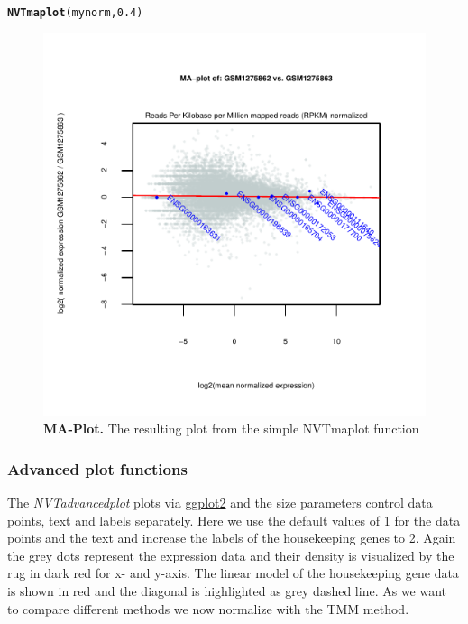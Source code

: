 \documentclass[11pt]{article}\usepackage[]{graphicx}\usepackage[usenames,dvipsnames]{color}
\makeatletter
\newcommand{\hlnum}[1]{\textcolor[rgb]{0.686,0.059,0.569}{#1}}%
\newcommand{\hlstd}[1]{\textcolor[rgb]{0.345,0.345,0.345}{#1}}%
\newcommand{\hlkwd}[1]{\textcolor[rgb]{0.737,0.353,0.396}{\textbf{#1}}}%
\newenvironment{kframe}{%
 \def\at@end@of@kframe{}%
 \ifinner\ifhmode%
  \def\at@end@of@kframe{\end{minipage}}%
  \begin{minipage}{\columnwidth}%
 \fi\fi%
 \def\FrameCommand##1{\hskip\@totalleftmargin \hskip-\fboxsep
 \colorbox{shadecolor}{##1}\hskip-\fboxsep
     \hskip-\linewidth \hskip-\@totalleftmargin \hskip\columnwidth}%
 \MakeFramed {\advance\hsize-\width
   \@totalleftmargin\z@ \linewidth\hsize
   \@setminipage}}%
 {\par\unskip\endMakeFramed%
 \at@end@of@kframe}
\newenvironment{knitrout}{}{} %
\makeatother
\begin{document}
\begin{knitrout}
\color{fgcolor}\begin{kframe}
\begin{alltt}
\hlkwd{NVTmaplot}\hlstd{(mynorm,}\hlnum{0.4}\hlstd{)}
\end{alltt}
\end{kframe}
\end{knitrout}

\begin{figure}[!h]
\centering
\includegraphics[width=.8\textwidth]{figure/simplemaplot-1}
\caption{
  \textbf{MA-Plot.}
  The resulting plot from the simple NVTmaplot function}
\label{fig:MA}
\end{figure}

\newpage

\subsubsection{Advanced plot functions}

The \textit{NVTadvancedplot} plots via \href{https://cran.r-project.org/web/packages/ggplot2/index.html}{ggplot2}\cite{wickham2009} and the size parameters control data points, text and labels separately. Here we use the default values of 1 for the data points and the text and increase the labels of the housekeeping genes to 2. Again the grey dots represent the expression data and their density is visualized by the rug in dark red for x- and y-axis.
The linear model of the housekeeping gene data is shown in red and the diagonal is highlighted as grey dashed line. As we want to compare different methods we now normalize with the TMM method.
\end{document}
